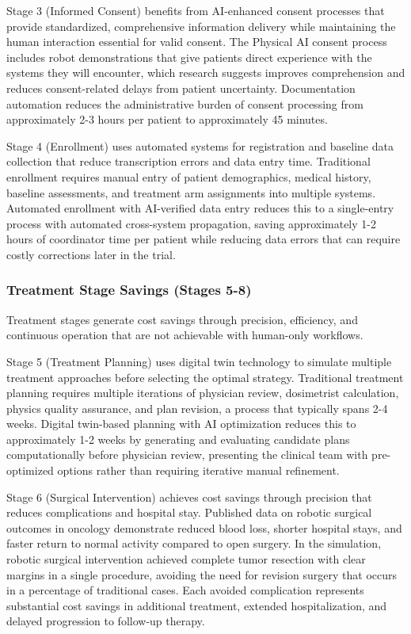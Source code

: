 Stage 3 (Informed Consent) benefits from AI-enhanced consent processes that
provide standardized, comprehensive information delivery while maintaining the
human interaction essential for valid consent. The Physical AI consent process
includes robot demonstrations that give patients direct experience with the
systems they will encounter, which research suggests improves comprehension and
reduces consent-related delays from patient uncertainty. Documentation
automation reduces the administrative burden of consent processing from
approximately 2-3 hours per patient to approximately 45 minutes.

Stage 4 (Enrollment) uses automated systems for registration and baseline data
collection that reduce transcription errors and data entry time. Traditional
enrollment requires manual entry of patient demographics, medical history,
baseline assessments, and treatment arm assignments into multiple systems.
Automated enrollment with AI-verified data entry reduces this to a
single-entry process with automated cross-system propagation, saving
approximately 1-2 hours of coordinator time per patient while reducing data
errors that can require costly corrections later in the trial.

\subsubsection{Treatment Stage Savings (Stages 5-8)}

Treatment stages generate cost savings through precision, efficiency, and
continuous operation that are not achievable with human-only workflows.

Stage 5 (Treatment Planning) uses digital twin technology to simulate multiple
treatment approaches before selecting the optimal strategy. Traditional
treatment planning requires multiple iterations of physician review,
dosimetrist calculation, physics quality assurance, and plan revision, a
process that typically spans 2-4 weeks. Digital twin-based planning with AI
optimization reduces this to approximately 1-2 weeks by generating and
evaluating candidate plans computationally before physician review, presenting
the clinical team with pre-optimized options rather than requiring iterative
manual refinement.

Stage 6 (Surgical Intervention) achieves cost savings through precision that
reduces complications and hospital stay. Published data on robotic surgical
outcomes in oncology demonstrate reduced blood loss, shorter hospital stays,
and faster return to normal activity compared to open surgery. In the
simulation, robotic surgical intervention achieved complete tumor resection
with clear margins in a single procedure, avoiding the need for revision
surgery that occurs in a percentage of traditional cases. Each avoided
complication represents substantial cost savings in additional treatment,
extended hospitalization, and delayed progression to follow-up therapy.

